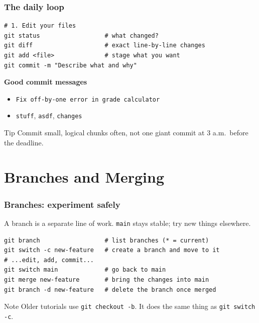 \documentclass[aspectratio=169,10pt,compress]{beamer}
\newcommand{\cmd}[1]{\texttt{\color{gitred}#1}}
\begin{document}
\begin{frame}[t,fragile] \frametitle{The daily loop}
\begin{lstlisting}
# 1. Edit your files
git status                  # what changed?
git diff                    # exact line-by-line changes
git add <file>              # stage what you want
git commit -m "Describe what and why"
\end{lstlisting}

  \vspace{0.3em}
  \textbf{Good commit messages}
  \begin{itemize}
    \item[\textcolor{green!50!black}{\checkmark}] \texttt{Fix off-by-one error in grade calculator}
    \item[\textcolor{red}{$\times$}] \texttt{stuff}, \texttt{asdf}, \texttt{changes}
  \end{itemize}

  \begin{block}{Tip}
    Commit small, logical chunks often, not one giant commit at 3 a.m.\ before the deadline.
  \end{block}
\end{frame}

\section[Branches]{Branches and Merging}

\begin{frame}[t,fragile] \frametitle{Branches: experiment safely}
  A branch is a separate line of work. \texttt{main} stays stable; try new things elsewhere.

\begin{lstlisting}
git branch                  # list branches (* = current)
git switch -c new-feature   # create a branch and move to it
# ...edit, add, commit...
git switch main             # go back to main
git merge new-feature       # bring the changes into main
git branch -d new-feature   # delete the branch once merged
\end{lstlisting}

  \begin{block}{Note}
    Older tutorials use \cmd{git checkout -b}. It does the same thing as \cmd{git switch -c}.
  \end{block}
\end{frame}
\end{document}
